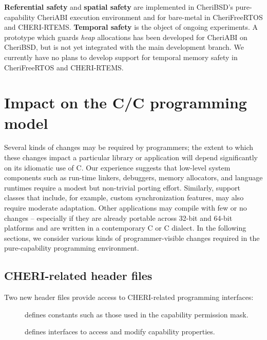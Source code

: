 \documentclass[12pt,twoside,openright,usletter]{article}
\newcommand{\ccode}[1]{{\small\ttfamily{#1}}}
\newcommand{\pathname}[1]{{\ccode{#1}}}
\newcommand{\note}[2]{{\color{blue}[ Note: #1 - #2]}}
\renewcommand{\note}[2]{\relax\ifhmode\unskip\fi}
\newcommand{\psnote}[1]{\note{#1}{Peter S.}}
\newcommand*{\cpp}[1][]{C\textsmaller[2]{\nolinebreak[4]\hspace{-.05em}\raisebox{.45ex}{\textbf{++}}}}
\newcommand*{\cppInHeader}[1][]{\texorpdfstring{\cpp{}}{C++}}
\begin{document}
\textbf{Referential safety} and \textbf{spatial safety} are
implemented in CheriBSD's pure-capability CheriABI execution
environment and for bare-metal in CheriFreeRTOS and CHERI-RTEMS.
\textbf{Temporal safety} is the object of ongoing experiments.  A prototype which
guards \emph{heap} allocations has been developed for CheriABI on CheriBSD, but
is not yet integrated with the main development branch.
We currently have no plans to develop support for temporal memory safety in
CheriFreeRTOS and CHERI-RTEMS.

%

\section{Impact on the C/\cppInHeader{} programming model}
\psnote{kinds/types, to avoid needless mental disambiguation}
Several kinds of changes may be required by programmers; the extent to which
these changes impact a particular library or application will depend
significantly on its idiomatic use of C.
Our experience suggests that low-level system components such as run-time
linkers, debuggers, memory allocators, and language runtimes require a modest
but non-trivial porting effort.
Similarly, support classes that include, for example, custom synchronization
features, may also require moderate adaptation.
Other applications may compile with few or no changes -- especially if they
are already portable across 32-bit and 64-bit platforms and are written in a contemporary C or \cpp{} dialect.
In the following sections, we consider various kinds of programmer-visible
changes required in the pure-capability programming environment.

\subsection{CHERI-related header files}

Two new header files provide access to CHERI-related programming interfaces:

\begin{description}
\item[\pathname{cheri/cheri.h}] defines constants such as those used in the
  capability permission mask.

\item[\pathname{cheri/cheric.h}] defines interfaces to access and
  modify capability properties.
\end{description}
\end{document}

